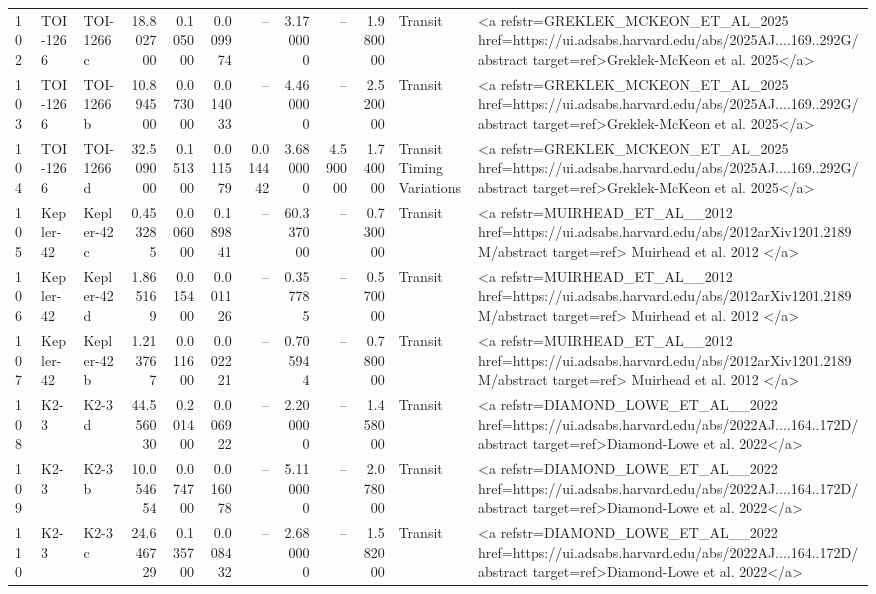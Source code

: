 \begin{tabular}{lllrrrrrrrll}
102 & TOI-1266 & TOI-1266 c & 18.802700 & 0.105000 & 0.009974 & -- & 3.170000 & -- & 1.980000 & Transit & <a refstr=GREKLEK_MCKEON_ET_AL_2025 href=https://ui.adsabs.harvard.edu/abs/2025AJ....169..292G/abstract target=ref>Greklek-McKeon et al. 2025</a> \\
103 & TOI-1266 & TOI-1266 b & 10.894500 & 0.073000 & 0.014033 & -- & 4.460000 & -- & 2.520000 & Transit & <a refstr=GREKLEK_MCKEON_ET_AL_2025 href=https://ui.adsabs.harvard.edu/abs/2025AJ....169..292G/abstract target=ref>Greklek-McKeon et al. 2025</a> \\
104 & TOI-1266 & TOI-1266 d & 32.509000 & 0.151300 & 0.011579 & 0.014442 & 3.680000 & 4.590000 & 1.740000 & Transit Timing Variations & <a refstr=GREKLEK_MCKEON_ET_AL_2025 href=https://ui.adsabs.harvard.edu/abs/2025AJ....169..292G/abstract target=ref>Greklek-McKeon et al. 2025</a> \\
105 & Kepler-42 & Kepler-42 c & 0.453285 & 0.006000 & 0.189841 & -- & 60.337000 & -- & 0.730000 & Transit & <a refstr=MUIRHEAD_ET_AL__2012 href=https://ui.adsabs.harvard.edu/abs/2012arXiv1201.2189M/abstract target=ref> Muirhead et al. 2012 </a> \\
106 & Kepler-42 & Kepler-42 d & 1.865169 & 0.015400 & 0.001126 & -- & 0.357785 & -- & 0.570000 & Transit & <a refstr=MUIRHEAD_ET_AL__2012 href=https://ui.adsabs.harvard.edu/abs/2012arXiv1201.2189M/abstract target=ref> Muirhead et al. 2012 </a> \\
107 & Kepler-42 & Kepler-42 b & 1.213767 & 0.011600 & 0.002221 & -- & 0.705944 & -- & 0.780000 & Transit & <a refstr=MUIRHEAD_ET_AL__2012 href=https://ui.adsabs.harvard.edu/abs/2012arXiv1201.2189M/abstract target=ref> Muirhead et al. 2012 </a> \\
108 & K2-3 & K2-3 d & 44.556030 & 0.201400 & 0.006922 & -- & 2.200000 & -- & 1.458000 & Transit & <a refstr=DIAMOND_LOWE_ET_AL__2022 href=https://ui.adsabs.harvard.edu/abs/2022AJ....164..172D/abstract target=ref>Diamond-Lowe et al. 2022</a> \\
109 & K2-3 & K2-3 b & 10.054654 & 0.074700 & 0.016078 & -- & 5.110000 & -- & 2.078000 & Transit & <a refstr=DIAMOND_LOWE_ET_AL__2022 href=https://ui.adsabs.harvard.edu/abs/2022AJ....164..172D/abstract target=ref>Diamond-Lowe et al. 2022</a> \\
110 & K2-3 & K2-3 c & 24.646729 & 0.135700 & 0.008432 & -- & 2.680000 & -- & 1.582000 & Transit & <a refstr=DIAMOND_LOWE_ET_AL__2022 href=https://ui.adsabs.harvard.edu/abs/2022AJ....164..172D/abstract target=ref>Diamond-Lowe et al. 2022</a> \\

\end{tabular}
